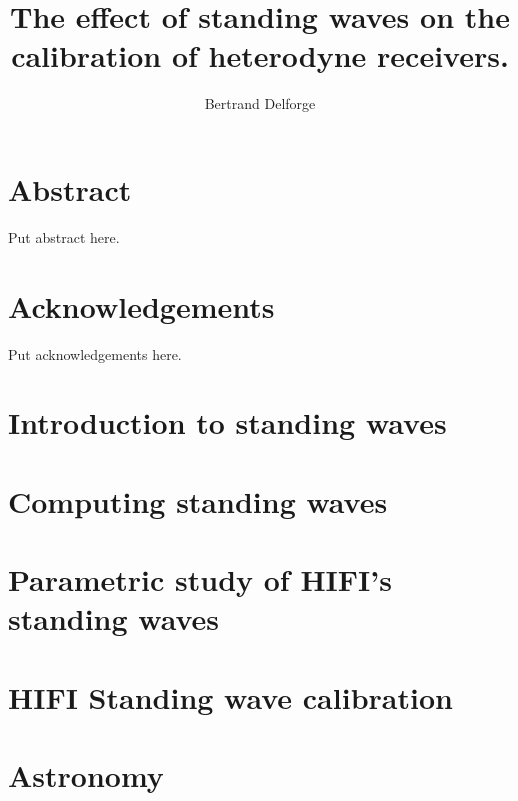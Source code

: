 \documentclass[a4paper,11pt]{book}
\title{The effect of standing waves on the calibration of heterodyne receivers.}
\author{Bertrand Delforge}
\begin{document}
\frontmatter
\maketitle
\tableofcontents
\newpage

\listoffigures
\newpage

\clearpage
\chapter{Abstract}
Put abstract here.

\clearpage
\chapter{Acknowledgements}
Put acknowledgements here.
\mainmatter

\cleardoublepage
\chapter{Introduction to standing waves}


\cleardoublepage
\chapter{Computing standing waves}


\cleardoublepage
\chapter{Parametric study of HIFI's standing waves}


\cleardoublepage
\chapter{HIFI Standing wave calibration}


\cleardoublepage
\chapter{Astronomy}


\backmatter

\cleardoublepage
{}
\printindex

\cleardoublepage
{}


\end{document}
